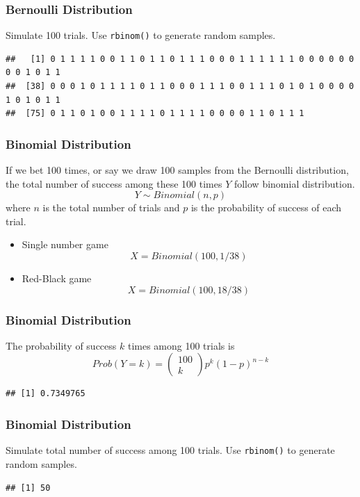 \documentclass[
  ignorenonframetext,
]{beamer}
\begin{document}
\begin{frame}[fragile]
\frametitle{Bernoulli Distribution}

Simulate 100 trials. Use \texttt{rbinom()} to generate random samples.

\small

\begin{verbatim}
##   [1] 0 1 1 1 1 0 0 1 1 0 1 1 0 1 1 1 0 0 0 1 1 1 1 1 1 0 0 0 0 0 0 0 0 1 0 1 1
##  [38] 0 0 0 1 0 1 1 1 1 0 1 1 0 0 0 1 1 1 0 0 1 1 1 0 1 0 1 0 0 0 0 1 0 1 0 1 1
##  [75] 0 1 1 0 1 0 0 1 1 1 1 0 1 1 1 1 0 0 0 0 1 1 0 1 1 1
\end{verbatim}
\end{frame}

\begin{frame}
\frametitle{Binomial Distribution}

If we bet 100 times, or say we draw 100 samples from the Bernoulli
distribution, the total number of success among these 100 times \(Y\)
follow binomial distribution. \[Y \sim Binomial(n, p) \] where \(n\) is
the total number of trials and \(p\) is the probability of success of
each trial.

\begin{itemize}
\item
  Single number game \[X = Binomial(100, 1/38)\]
\item
  Red-Black game \[X = Binomial(100, 18/38)\]
\end{itemize}
\end{frame}

\begin{frame}[fragile]
\frametitle{Binomial Distribution}

The probability of success \(k\) times among 100 trials is
\[Prob(Y=k) = 
\left(\begin{array}{c}
100\\
k
\end{array}\right) 
p^k (1-p)^{n-k}\]

\begin{verbatim}
## [1] 0.7349765
\end{verbatim}
\end{frame}

\begin{frame}[fragile]
\frametitle{Binomial Distribution}

Simulate total number of success among 100 trials. Use \texttt{rbinom()}
to generate random samples.

\small

\begin{verbatim}
## [1] 50
\end{verbatim}
\end{frame}
\end{document}
